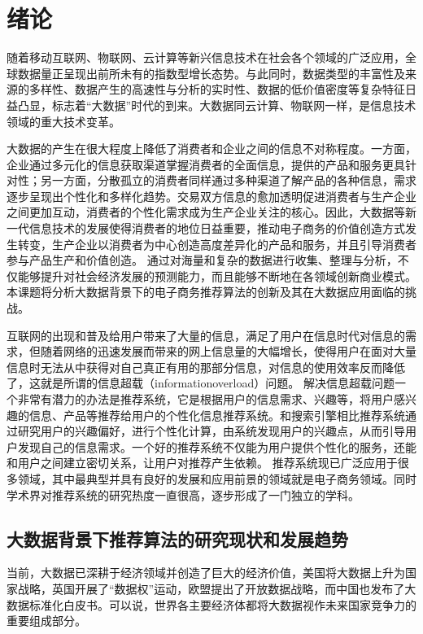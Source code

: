 
\chapter{绪论}
随着移动互联网、物联网、云计算等新兴信息技术在社会各个领域的广泛应用，全球数据量正呈现出前所未有的指数型增长态势。与此同时，数据类型的丰富性及来源的多样性、数据产生的高速性与分析的实时性、数据的低价值密度等复杂特征日益凸显，标志着“大数据”时代的到来。大数据同云计算、物联网一样，是信息技术领域的重大技术变革。

大数据的产生在很大程度上降低了消费者和企业之间的信息不对称程度。一方面，企业通过多元化的信息获取渠道掌握消费者的全面信息，提供的产品和服务更具针对性；另一方面，分散孤立的消费者同样通过多种渠道了解产品的各种信息，需求逐步呈现出个性化和多样化趋势。交易双方信息的愈加透明促进消费者与生产企业之间更加互动，消费者的个性化需求成为生产企业关注的核心。因此，大数据等新一代信息技术的发展使得消费者的地位日益重要，推动电子商务的价值创造方式发生转变，生产企业以消费者为中心创造高度差异化的产品和服务，并且引导消费者参与产品生产和价值创造。
通过对海量和复杂的数据进行收集、整理与分析，不仅能够提升对社会经济发展的预测能力，而且能够不断地在各领域创新商业模式。本课题将分析大数据背景下的电子商务推荐算法的创新及其在大数据应用面临的挑战。

互联网的出现和普及给用户带来了大量的信息，满足了用户在信息时代对信息的需求，但随着网络的迅速发展而带来的网上信息量的大幅增长，使得用户在面对大量信息时无法从中获得对自己真正有用的那部分信息，对信息的使用效率反而降低了，这就是所谓的信息超载（informationoverload）问题。
解决信息超载问题一个非常有潜力的办法是推荐系统，它是根据用户的信息需求、兴趣等，将用户感兴趣的信息、产品等推荐给用户的个性化信息推荐系统。和搜索引擎相比推荐系统通过研究用户的兴趣偏好，进行个性化计算，由系统发现用户的兴趣点，从而引导用户发现自己的信息需求。一个好的推荐系统不仅能为用户提供个性化的服务，还能和用户之间建立密切关系，让用户对推荐产生依赖。
推荐系统现已广泛应用于很多领域，其中最典型并具有良好的发展和应用前景的领域就是电子商务领域。同时学术界对推荐系统的研究热度一直很高，逐步形成了一门独立的学科。


\section{大数据背景下推荐算法的研究现状和发展趋势}
当前，大数据已深耕于经济领域并创造了巨大的经济价值，美国将大数据上升为国家战略，英国开展了“数据权”运动，欧盟提出了开放数据战略，而中国也发布了大数据标准化白皮书。可以说，世界各主要经济体都将大数据视作未来国家竞争力的重要组成部分。

